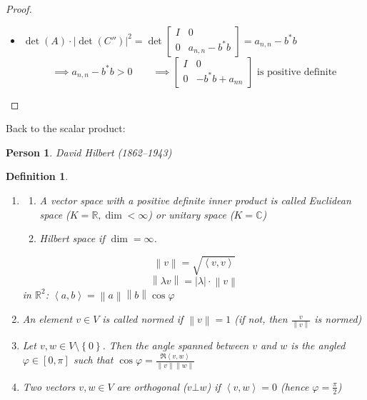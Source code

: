\documentclass[a4paper]{article}
\newcounter{lecref}[section]
\numberwithin{lecref}{section}
\newtheorem{definition}[lecref]{Definition}
\newtheorem*{Person}{Person}
\newcommand{\set}[1]{\left\{#1\right\}}
\newcommand{\ip}[2]{\left\langle#1,#2\right\rangle} %
\newcommand{\norm}[1]{\left\|#1\right\|}
\newcommand{\card}[1]{\left|#1\right|}
\begin{document}
\begin{proof}
\begin{description}
\begin{description}
\begin{itemize}
            \item 
              $
                \det(A) \cdot \card{\det(C'')}^2 = \det\begin{bmatrix}
                  I & 0 \\
                  0 & a_{n,n} - b^* b
                \end{bmatrix} = a_{n,n} - b^* b$
              \[
                \implies a_{n,n} - b^* b > 0
                \qquad
                \implies \begin{bmatrix}
                  I & 0 \\
                  0 & -b^* b + a_{nn}
                \end{bmatrix}
                \text{ is positive definite}
              \]
          \end{itemize}
      \end{description}
  \end{description}
\end{proof}

Back to the scalar product:

\begin{Person}
  David Hilbert (1862--1943)
\end{Person}

\begin{definition} %
  \begin{enumerate}
    \item
      \begin{enumerate}
        \item A vector space with a positive definite inner product
          is called \emph{Euclidean space} ($K = \mathbb R, \dim < \infty$)
          or \emph{unitary space} ($K = \mathbb C$)
        \item Hilbert space if $\dim = \infty$.
      \end{enumerate}

      \[ \norm{v} = \sqrt{\ip vv} \]
      \[ \norm{\lambda v} = \card{\lambda} \cdot \norm{v} \]
      in $\mathbb R^2$: $\ip ab = \norm{a} \norm{b} \cos{\varphi}$
    \item An element $v \in V$ is called \emph{normed} if $\norm{v} = 1$
      (if not, then $\frac{v}{\norm{v}}$ is normed)
    \item
      Let $v, w \in V \setminus \set{0}$. Then the angle spanned between $v$ and $w$ is the angled $\varphi \in [0, \pi]$
      such that $\cos{\varphi} = \frac{\Re{\ip vw}}{\norm{v} \norm{w}}$
    \item Two vectors $v, w \in V$ are orthogonal ($v \bot w$)
      if $\ip vw = 0$ (hence $\varphi = \frac\pi2$)
  \end{enumerate}
\end{definition}
\end{document}
